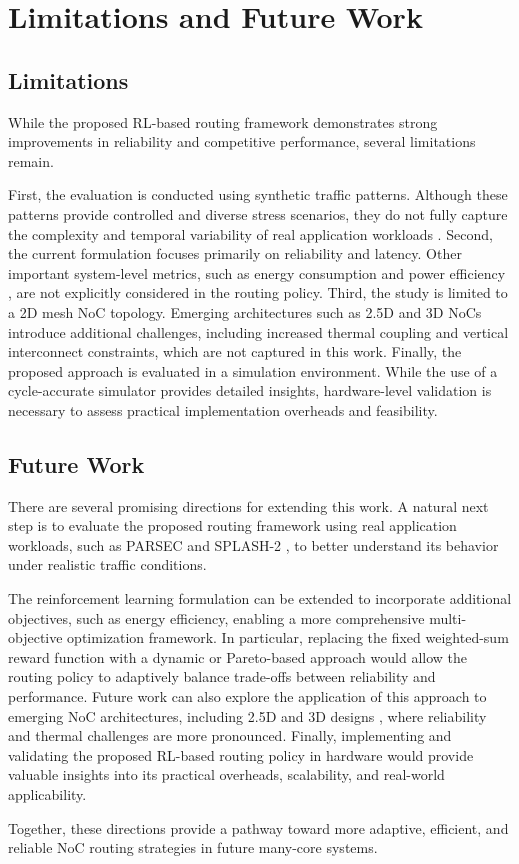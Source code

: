 \chapter{Limitations and Future Work}

\section{Limitations}

While the proposed RL-based routing framework demonstrates strong improvements in reliability and competitive performance, several limitations remain.

First, the evaluation is conducted using synthetic traffic patterns. Although these patterns provide controlled and diverse stress scenarios, they do not fully capture the complexity and temporal variability of real application workloads \cite{Malikov2025}. Second, the current formulation focuses primarily on reliability and latency. Other important system-level metrics, such as energy consumption and power efficiency \cite{Wu2017}, are not explicitly considered in the routing policy. Third, the study is limited to a 2D mesh NoC topology. Emerging architectures such as 2.5D and 3D NoCs \cite{Kondoth2026} introduce additional challenges, including increased thermal coupling and vertical interconnect constraints, which are not captured in this work. Finally, the proposed approach is evaluated in a simulation environment. While the use of a cycle-accurate simulator \cite{gem5} provides detailed insights, hardware-level validation is necessary to assess practical implementation overheads and feasibility.

\section{Future Work}

There are several promising directions for extending this work. A natural next step is to evaluate the proposed routing framework using real application workloads, such as PARSEC \cite{PARSEC} and SPLASH-2 \cite{Splash2}, to better understand its behavior under realistic traffic conditions.

The reinforcement learning formulation can be extended to incorporate additional objectives, such as energy efficiency, enabling a more comprehensive multi-objective optimization framework. In particular, replacing the fixed weighted-sum reward function with a dynamic or Pareto-based approach \cite{BahlousBoldi2025ParetoOptimal} would allow the routing policy to adaptively balance trade-offs between reliability and performance. Future work can also explore the application of this approach to emerging NoC architectures, including 2.5D and 3D designs \cite{Kondoth2026}, where reliability and thermal challenges are more pronounced. Finally, implementing and validating the proposed RL-based routing policy in hardware would provide valuable insights into its practical overheads, scalability, and real-world applicability. 

Together, these directions provide a pathway toward more adaptive, efficient, and reliable NoC routing strategies in future many-core systems.